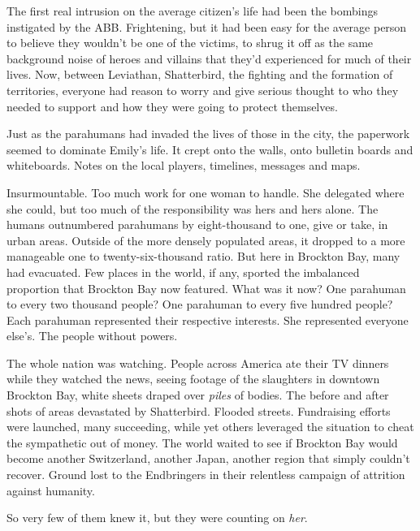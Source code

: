 The first real intrusion on the average citizen's life had been the bombings instigated by the ABB.  Frightening, but it had been easy for the average person to believe they wouldn't be one of the victims, to shrug it off as the same background noise of heroes and villains that they'd experienced for much of their lives.  Now, between Leviathan, Shatterbird, the fighting and the formation of territories, everyone had reason to worry and give serious thought to who they needed to support and how they were going to protect themselves.



Just as the parahumans had invaded the lives of those in the city, the paperwork seemed to dominate Emily's life.  It crept onto the walls, onto bulletin boards and whiteboards.  Notes on the local players, timelines, messages and maps.



Insurmountable.  Too much work for one woman to handle.  She delegated where she could, but too much of the responsibility was hers and hers alone.  The humans outnumbered parahumans by eight-thousand to one, give or take, in urban areas.  Outside of the more densely populated areas, it dropped to a more manageable one to twenty-six-thousand ratio.  But here in Brockton Bay, many had evacuated.  Few places in the world, if any, sported the imbalanced proportion that Brockton Bay now featured.  What was it now?  One parahuman to every two thousand people?  One parahuman to every five hundred people?  Each parahuman represented their respective interests.  She represented everyone else's.  The people without powers.



The whole nation was watching.  People across America ate their TV dinners while they watched the news, seeing footage of the slaughters in downtown Brockton Bay, white sheets draped over \emph{piles} of bodies.  The before and after shots of areas devastated by Shatterbird.  Flooded streets.  Fundraising efforts were launched, many succeeding, while yet others leveraged the situation to cheat the sympathetic out of money.  The world waited to see if Brockton Bay would become another Switzerland, another Japan, another region that simply couldn't recover.  Ground lost to the Endbringers in their relentless campaign of attrition against humanity.



So very few of them knew it, but they were counting on \emph{her}.




